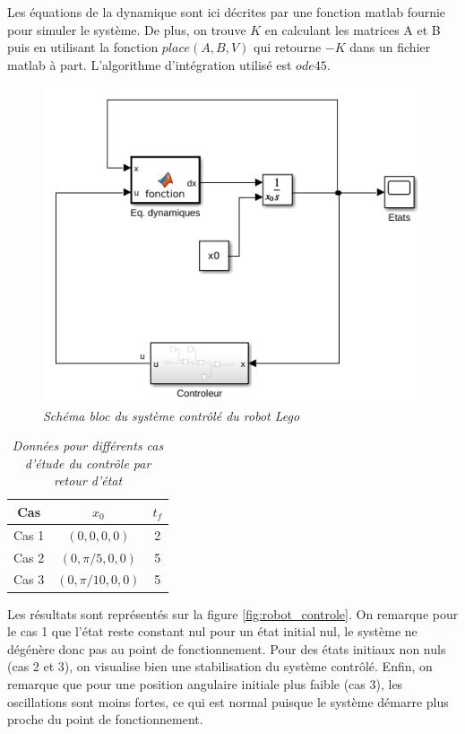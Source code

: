 \documentclass[11pt,french]{article} %
\begin{document}
Les équations de la dynamique sont ici décrites par une fonction matlab fournie pour simuler le système. De plus, on trouve $K$ en calculant les matrices A et B puis en utilisant la fonction $place(A,B,V)$ qui retourne $-K$ dans un fichier matlab à part. L'algorithme d'intégration utilisé est $ode45$. \\

\begin{figure}[H]
    \centering
    \includegraphics[width=12cm]{simulink_tp3_1.png} 
		\caption{\textit{Schéma bloc du système contrôlé du robot Lego}}
		\label{fig:simulink_tp3_1}
\end{figure}
\vspace{0.5cm}

\begin{table}[h!]
\centering
\begin{tabular}{|c c c|} 
 \hline
 Cas & $x_0$ & $t_f$ \\ [0.5ex] 
 \hline\hline
 Cas 1 & $(0,0,0,0)$ & 2 \\ 
 Cas 2 & $(0,\pi/5,0,0)$ & 5 \\ 
 Cas 3 & $(0,\pi/10,0,0)$ & 5 \\ [1ex] 
 \hline
\end{tabular}
\caption{\textit{Données pour différents cas d'étude du contrôle par retour d'état}}
\label{table:3}
\end{table}

Les résultats sont représentés sur la figure \ref{fig:robot_controle}. On remarque pour le cas 1 que l'état reste constant nul pour un état initial nul, le système ne dégénère donc pas au point de fonctionnement. Pour des états initiaux non nuls (cas 2 et 3), on visualise bien une stabilisation du système contrôlé. Enfin, on remarque que pour une position angulaire initiale plus faible (cas 3), les oscillations sont moins fortes, ce qui est normal puisque le système démarre plus proche du point de fonctionnement. \\ 
\end{document}

